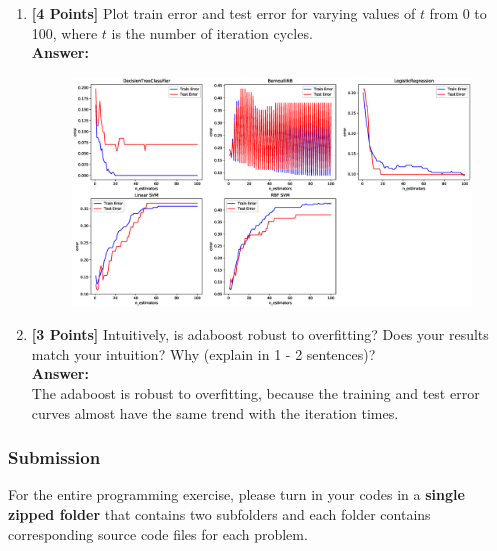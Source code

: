 \documentclass{article}
\begin{document}
\begin{enumerate}
	\item \textbf{[4 Points]} Plot train error and test error for varying values of $t$ from 0 to 100, where $t$ is the number of iteration cycles.\\
	\textbf{Answer:}\\
	\begin{figure}[!h]
		\centering
		\includegraphics[width=\textwidth]{./img/adaboosterr.eps}
	\end{figure}
	
	
	\item \textbf{[3 Points]} Intuitively, is adaboost robust to overfitting? Does your results match your intuition? Why (explain in 1 - 2 sentences)?\\
	\textbf{Answer:}\\
	The adaboost is robust to overfitting, because the training and test error curves almost have the same trend with the iteration times.
	
\end{enumerate}

\subsubsection*{Submission}
For the entire programming exercise, please turn in your codes in a \textbf{single zipped folder} that contains two subfolders and each folder contains corresponding source code files for each problem.
\end{document}
